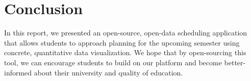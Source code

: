 \documentclass{article}
\begin{document}
\section{Conclusion}
In this report, we presented an open-source, open-data scheduling application that allows students to approach planning for the upcoming semester using concrete, quantitative data visualization. We hope that by open-sourcing this tool, we can encourage students to build on our platform and become better-informed about their university and quality of education.
\end{document}
